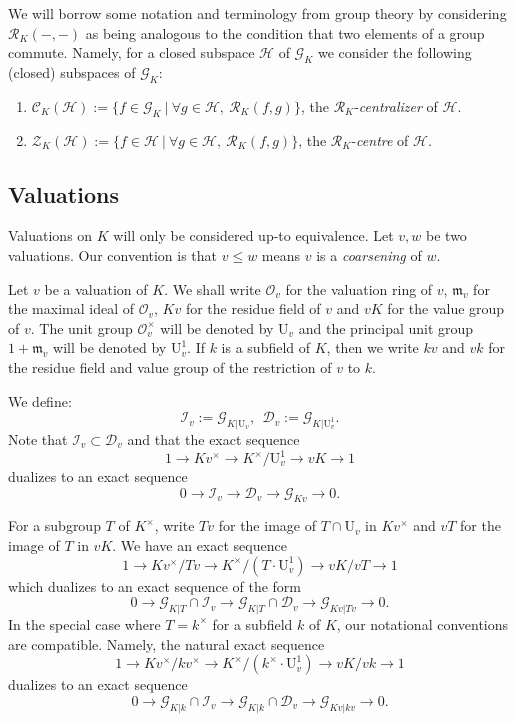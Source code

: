 \documentclass[12pt]{amsart}
\newcommand{\Urm}{\mathrm{U}}
\newcommand{\Ocal}{\mathcal{O}}
\newcommand{\mfrak}{\mathfrak{m}}
\newcommand{\Zcal}{\mathcal{Z}}
\newcommand{\Ccal}{\mathcal{C}}
\newcommand{\Gcal}{\mathcal{G}}
\newcommand{\Rcal}{\mathcal{R}}
\newcommand{\Dcal}{\mathcal{D}}
\newcommand{\Ical}{\mathcal{I}}
\newcommand{\Hcal}{\mathcal{H}}
\theoremstyle{definition}
\begin{document}
We will borrow some notation and terminology from group theory by considering $\Rcal_{K}(-,-)$ as being analogous to the condition that two elements of a group commute.
Namely, for a closed subspace $\Hcal$ of $\Gcal_{K}$ we consider the following (closed) subspaces of $\Gcal_{K}$:
\begin{enumerate}
  \item $\Ccal_{K}(\Hcal) := \{f \in \Gcal_{K} \ | \ \forall g \in \Hcal, \ \Rcal_{K}(f,g)\}$, the $\Rcal_{K}$-\emph{centralizer} of $\Hcal$.
  \item $\Zcal_{K}(\Hcal) := \{f \in \Hcal \ | \ \forall g \in \Hcal, \ \Rcal_{K}(f,g)\}$, the $\Rcal_{K}$-\emph{centre} of $\Hcal$.
\end{enumerate}

\subsection{Valuations}

Valuations on $K$ will only be considered up-to equivalence.
Let $v,w$ be two valuations.
Our convention is that $v \le w$ means $v$ is a \emph{coarsening} of $w$.

Let $v$ be a valuation of $K$.
We shall write $\Ocal_{v}$ for the valuation ring of $v$, $\mfrak_{v}$ for the maximal ideal of $\Ocal_{v}$, $Kv$ for the residue field of $v$ and $vK$ for the value group of $v$.
The unit group $\Ocal_{v}^{\times}$ will be denoted by $\Urm_{v}$ and the principal unit group $1 + \mfrak_{v}$ will be denoted by $\Urm_{v}^{1}$.
If $k$ is a subfield of $K$, then we write $kv$ and $vk$ for the residue field and value group of the restriction of $v$ to $k$.

We define:
\[ \Ical_{v} := \Gcal_{K|\Urm_{v}}, \ \ \Dcal_{v} := \Gcal_{K|\Urm_{v}^{1}}. \]
Note that $\Ical_{v} \subset \Dcal_{v}$ and that the exact sequence
\[ 1 \to Kv^{\times} \to K^{\times}/\Urm_{v}^{1} \to vK \to 1 \]
dualizes to an exact sequence
\[ 0 \to \Ical_{v} \to \Dcal_{v} \to \Gcal_{Kv} \to 0. \]

For a subgroup $T$ of $K^{\times}$, write $Tv$ for the image of $T \cap \Urm_{v}$ in $Kv^{\times}$ and $vT$ for the image of $T$ in $vK$.
We have an exact sequence
\[ 1 \to Kv^{\times}/Tv \to K^{\times}/(T \cdot \Urm_{v}^{1}) \to vK/vT \to 1 \]
which dualizes to an exact sequence of the form
\[ 0 \to \Gcal_{K|T} \cap \Ical_{v} \to \Gcal_{K|T} \cap \Dcal_{v} \to \Gcal_{Kv|Tv} \to 0. \]
In the special case where $T = k^{\times}$ for a subfield $k$ of $K$, our notational conventions are compatible.
Namely, the natural exact sequence
\[ 1 \to Kv^{\times}/kv^{\times} \to K^{\times}/(k^{\times} \cdot \Urm_{v}^{1}) \to vK/vk \to 1 \]
dualizes to an exact sequence
\[ 0 \to \Gcal_{K|k} \cap \Ical_{v} \to \Gcal_{K|k} \cap \Dcal_{v} \to \Gcal_{Kv|kv} \to 0. \]
\end{document}
